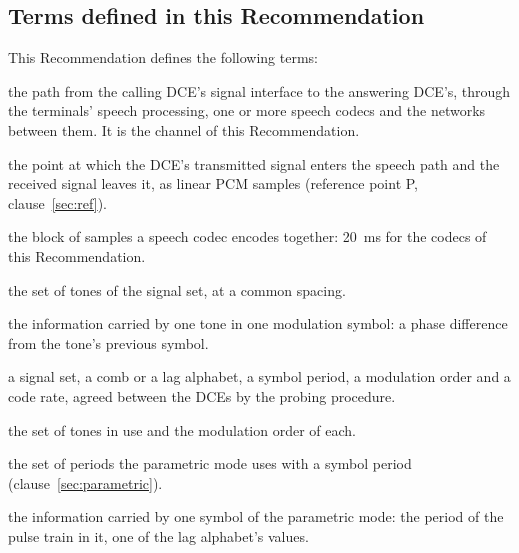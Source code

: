 \documentclass[a4paper,11pt]{article}
\begin{document}
\subsection{Terms defined in this Recommendation}
This Recommendation defines the following terms:
\begin{description}[style=sameline,font=\bfseries]
\item[speech path] the path from the calling DCE's signal interface to the
  answering DCE's, through the terminals' speech processing, one or more
  speech codecs and the networks between them.  It is the channel of this
  Recommendation.
\item[signal interface] the point at which the DCE's transmitted signal
  enters the speech path and the received signal leaves it, as linear PCM
  samples (reference point P, clause~\ref{sec:ref}).
\item[codec frame] the block of samples a speech codec encodes together:
  20~ms for the codecs of this Recommendation.
\item[comb] the set of tones of the signal set, at a common spacing.
\item[tone symbol] the information carried by one tone in one modulation
  symbol: a phase difference from the tone's previous symbol.
\item[mode] a signal set, a comb or a lag alphabet, a symbol period, a
  modulation order and a code rate, agreed between the DCEs by the
  probing procedure.
\item[loading] the set of tones in use and the modulation order of each.
\item[lag alphabet] the set of periods the parametric mode uses with a
  symbol period (clause~\ref{sec:parametric}).
\item[lag symbol] the information carried by one symbol of the parametric
  mode: the period of the pulse train in it, one of the lag alphabet's
  values.
\end{description}
\end{document}
